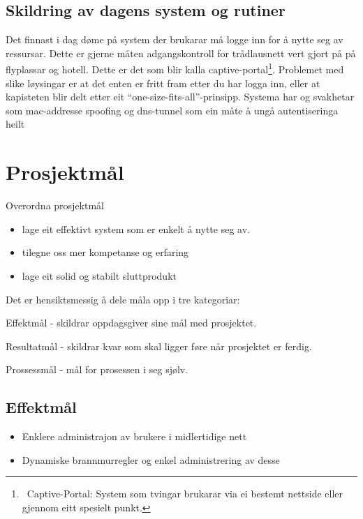 \documentclass[12pt]{article}
\begin{document}
\subsection{Skildring av dagens system og rutiner}

Det finnast i dag døme på system der brukarar må logge inn for å nytte seg av ressursar. Dette er gjerne måten adgangskontroll for trådlausnett vert gjort på på flyplassar og hotell. Dette er det som blir kalla captive-portal\footnote{\ Captive{}-Portal: System som tvingar brukarar via ei bestemt nettside eller gjennom eitt spesielt punkt. }. Problemet med slike løysingar er at det enten er fritt fram etter du har logga inn, eller at kapisteten blir delt etter eit “one-size-fits-all”-prinsipp. Systema har og svakhetar som mac-addresse spoofing og dns-tunnel som ein måte å ungå autentiseringa heilt

\section{Prosjektmål}

Overordna prosjektmål

\begin{itemize}
\item lage eit effektivt system som er enkelt å nytte seg av.
\end{itemize}
\begin{itemize}
\item tilegne oss mer kompetanse og erfaring 
\end{itemize}
\begin{itemize}
\item lage eit solid og stabilt sluttprodukt
\end{itemize}



Det er hensiktsmessig å dele måla opp i tre kategoriar:

Effektmål - skildrar oppdagsgiver sine mål med prosjektet. 

Resultatmål - skildrar kvar som skal ligger føre når prosjektet er ferdig. \ 

Prossessmål - mål for prosessen i seg sjølv. 

\subsection{Effektmål}

\begin{itemize}
\item Enklere administrajon av brukere i midlertidige nett
\item Dynamiske brannmurregler og enkel administrering av desse
\end{itemize}
\end{document}

